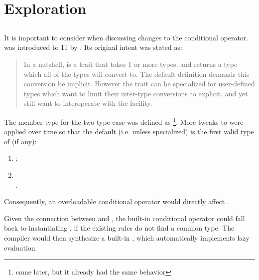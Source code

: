 \section{Exploration}

\subsection{}\label{sec:common_type intro}
It is important to consider  when discussing changes to the conditional operator.
 was introduced to \CC{}11 by \textcite{N2661}.
Its original intent was stated as:
\begin{quote}{}
  In a nutshell,  is a trait that takes 1 or more types, and returns a type which all of the types will convert to.
  The default definition demands this conversion be implicit.
  However the trait can be specialized for user-defined types which want to limit their inter-type conversions to explicit, and yet still want to interoperate with the  facility.
\end{quote}
The member type  for the two-type case was defined as \footnote{ came later, but it already had the same behavior}.
More tweaks to  were applied over time so that the default  (i.e. unless specialized) is the first valid type of (if any):
\begin{enumerate}
  \item {};
  \item {}\\.
\end{enumerate}
Consequently, an overloadable conditional operator would directly affect \std{}.

Given the connection between  and , the built-in conditional operator could fall back to instantiating \std{}, if the existing rules do not find a common type.
The compiler would then synthesize a built-in , which automatically implements lazy evaluation.

%

